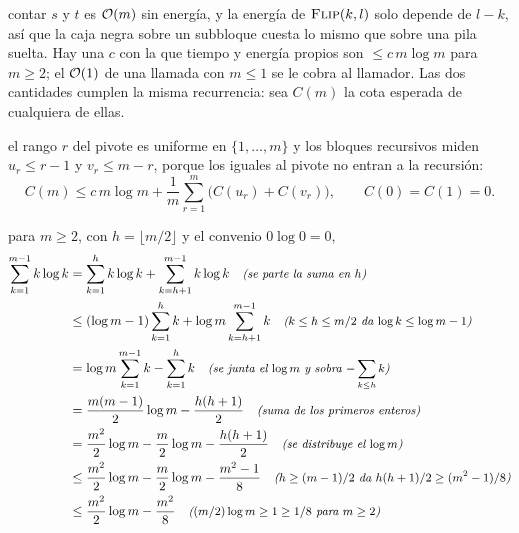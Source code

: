 \documentclass[11pt,letterpaper]{article}
\begin{document}
 contar $s$ y $t$ es $\mathcal{O}\!\left(m\right)$ sin
energía, y la energía de $\textsc{Flip}(k, l)$ solo depende de
$l - k$, así que la caja negra sobre un subbloque cuesta lo mismo que
sobre una pila suelta. Hay una $c$ con la que tiempo y energía propios
son $\le c\,m \log m$ para $m \ge 2$; el $\mathcal{O}\!\left(1\right)$ de una llamada con
$m \le 1$ se le cobra al llamador. Las dos cantidades cumplen la misma
recurrencia: sea $C(m)$ la cota esperada de cualquiera de ellas.

 el rango $r$ del pivote es uniforme en
$\{1, \dots, m\}$ y los bloques recursivos miden $u_r \le r - 1$ y
$v_r \le m - r$, porque los iguales al pivote no entran a la recursión:
\begin{equation}\label{ej14:ej14-rec-esperada}
  C(m) \le c\,m \log m
       + \frac{1}{m} \sum_{r=1}^{m} \bigl(C(u_r) + C(v_r)\bigr),
  \qquad C(0) = C(1) = 0 .
\end{equation}

 para $m \ge 2$, con $h = \lfloor m/2 \rfloor$
y el convenio $0 \log 0 = 0$,
\begin{align*}
  \sum_{k=1}^{m-1} k \log k
    &= \sum_{k=1}^{h} k \log k + \sum_{k=h+1}^{m-1} k \log k
       \quad\text{\small\itshape (se parte la suma en $h$)} \\
    &\le (\log m - 1) \sum_{k=1}^{h} k
         + \log m \sum_{k=h+1}^{m-1} k
       \quad\text{\small\itshape ($k \le h \le m/2$ da $\log k \le \log m - 1$)} \\
    &= \log m \sum_{k=1}^{m-1} k - \sum_{k=1}^{h} k
       \quad\text{\small\itshape (se junta el $\log m$ y sobra $-\sum_{k \le h} k$)} \\
    &= \frac{m(m-1)}{2} \log m - \frac{h(h+1)}{2}
       \quad\text{\small\itshape (suma de los primeros enteros)} \\
    &= \frac{m^{2}}{2} \log m - \frac{m}{2} \log m
       - \frac{h(h+1)}{2}
       \quad\text{\small\itshape (se distribuye el $\log m$)} \\
    &\le \frac{m^{2}}{2} \log m - \frac{m}{2} \log m
         - \frac{m^{2} - 1}{8}
       \quad\text{\small\itshape ($h \ge (m-1)/2$ da $h(h+1)/2 \ge (m^{2}-1)/8$)} \\
    &\le \frac{m^{2}}{2} \log m - \frac{m^{2}}{8}
       \quad\text{\small\itshape ($(m/2) \log m \ge 1 \ge 1/8$ para $m \ge 2$)}
\end{align*}
\end{document}
